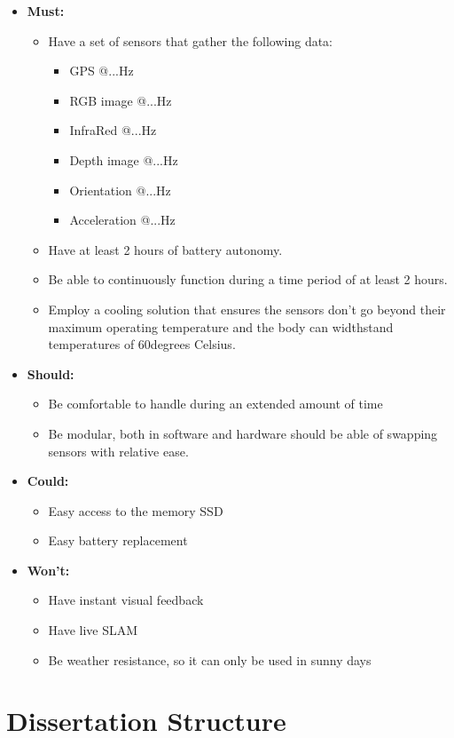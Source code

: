 \begin{itemize}
    \item \textbf{Must:}
    \begin{itemize}
        \item Have a set of sensors that gather the following data:
        \begin{itemize}
            \item GPS @...Hz
            \item RGB image @...Hz
            \item InfraRed @...Hz
            \item Depth image @...Hz
            \item Orientation @...Hz
            \item Acceleration @...Hz
        \end{itemize}
        \item Have at least 2 hours of battery autonomy.
        \item Be able to continuously function during a time period of at least 2 hours.
        \item Employ a cooling solution that ensures the sensors don't go beyond their maximum operating temperature and the body can widthstand temperatures of 60degrees Celsius.
    \end{itemize}
    \item \textbf{Should:}
    \begin{itemize}   
        \item Be comfortable to handle during an extended amount of time
        \item Be modular, both in software and hardware should be able of swapping sensors with relative ease.
    \end{itemize}
    \item \textbf{Could:}
    \begin{itemize}   
        \item Easy access to the memory SSD
        \item Easy battery replacement
    \end{itemize}
    \item \textbf{Won't:}
    \begin{itemize}
        \item Have instant visual feedback
        \item Have live \acl*{SLAM}
        \item Be weather resistance, so it can only be used in sunny days
    \end{itemize}
\end{itemize}


\section{Dissertation Structure}